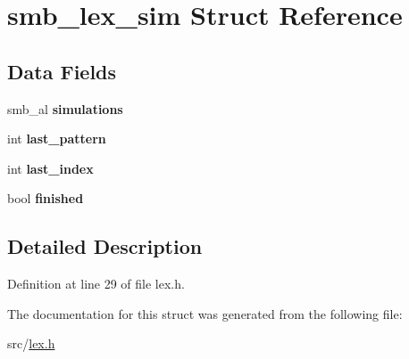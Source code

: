 \hypertarget{structsmb__lex__sim}{\section{smb\-\_\-lex\-\_\-sim \-Struct \-Reference}
\label{structsmb__lex__sim}
}
\subsection*{\-Data \-Fields}
\begin{DoxyCompactItemize}
\item 
\hypertarget{structsmb__lex__sim_a322e99f0764ad9729090ffee6dd746e9}{smb\-\_\-al {\bfseries simulations}}\label{structsmb__lex__sim_a322e99f0764ad9729090ffee6dd746e9}

\item 
\hypertarget{structsmb__lex__sim_ac2223b714d2cd11cf2716b2dd975a578}{int {\bfseries last\-\_\-pattern}}\label{structsmb__lex__sim_ac2223b714d2cd11cf2716b2dd975a578}

\item 
\hypertarget{structsmb__lex__sim_acb33d3d488accef766f58627ba85260d}{int {\bfseries last\-\_\-index}}\label{structsmb__lex__sim_acb33d3d488accef766f58627ba85260d}

\item 
\hypertarget{structsmb__lex__sim_a9324389a5cdc532c6417a87ccafe18ce}{bool {\bfseries finished}}\label{structsmb__lex__sim_a9324389a5cdc532c6417a87ccafe18ce}

\end{DoxyCompactItemize}


\subsection{\-Detailed \-Description}


\-Definition at line 29 of file lex.\-h.



\-The documentation for this struct was generated from the following file\-:\begin{DoxyCompactItemize}
\item 
src/\hyperlink{lex_8h}{lex.\-h}\end{DoxyCompactItemize}

